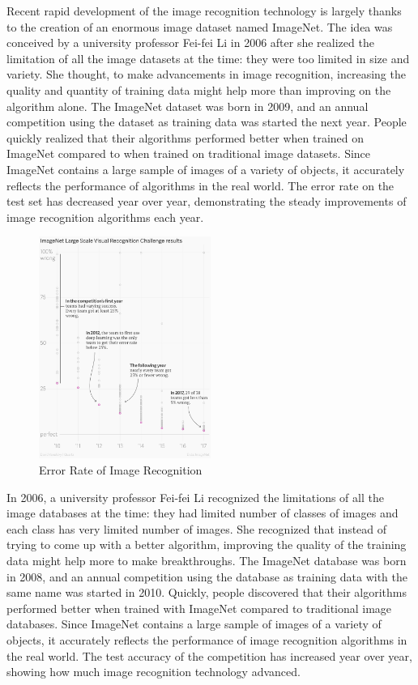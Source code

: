 \documentclass[letterpaper]{article} %
\begin{document}
Recent rapid development of the image recognition technology is largely thanks to the creation of an enormous image dataset named ImageNet. The idea was conceived by a university professor Fei-fei Li in 2006 after she realized the limitation of all the image datasets at the time: they were too limited in size and variety. She thought, to make advancements in image recognition, increasing the quality and quantity of training data might help more than improving on the algorithm alone. The ImageNet dataset was born in 2009, and an annual competition using the dataset as training data was started the next year. People quickly realized that their algorithms performed better when trained on ImageNet compared to when trained on traditional image datasets. Since ImageNet contains a large sample of images of a variety of objects, it accurately reflects the performance of algorithms in the real world. The error rate on the test set has decreased year over year, demonstrating the steady improvements of image recognition algorithms each year. 
\begin{figure}[h!]
 \centering
  \includegraphics[width=0.5\textwidth]{intro.png}
 \caption{Error Rate of Image Recognition}
 \end{figure}

In 2006, a university professor Fei-fei Li recognized the limitations of all the image databases at the time: they had limited number of classes of images and each class has very limited number of images. She recognized that instead of trying to come up with a better algorithm, improving the quality of the training data might help more to make breakthroughs. The ImageNet database was born in 2008, and an annual competition using the database as training data with the same name was started in 2010. Quickly, people discovered that their algorithms performed better when trained with ImageNet compared to traditional image databases. Since ImageNet contains a large sample of images of a variety of objects, it accurately reflects the performance of image recognition algorithms in the real world. The test accuracy of the competition has increased year over year, showing how much image recognition technology advanced.
\end{document}
